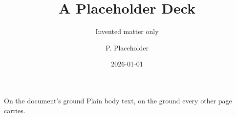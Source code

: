 \documentclass[aspectratio=169]{slides}
\title{A Placeholder Deck}
\subtitle{Invented matter only}
\author{P. Placeholder}
\institute{example.org}
\date{2026-01-01}
\begin{document}
\maketitle

\begin{frame}{On the document's ground}
  Plain body text, on the ground every other page carries.
\end{frame}
\end{document}
